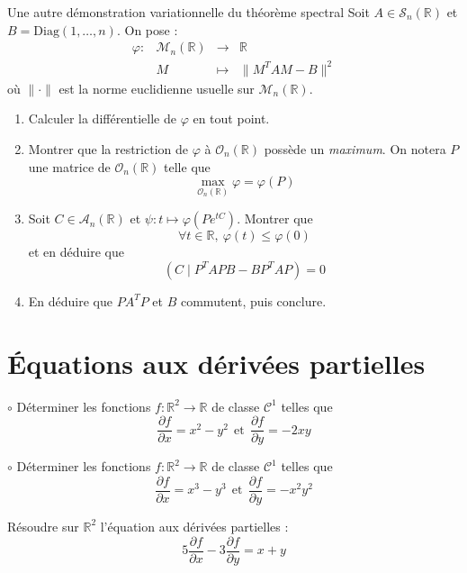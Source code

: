 \documentclass[french,a4paper]{article}
\newcommand{\R}{\mathbb{R}}
\theoremstyle{plain}
\theoremstyle{definition}
\theoremstyle{remark}
\begin{document}
\begin{ex}{Une autre démonstration variationnelle du théorème spectral}
	Soit $A\in\mathcal{S}_n(\R)$ et $B=\text{Diag}(1,\ldots,n)$. On pose : $$\begin{array}{lrcl}
		\varphi:&\mathcal{M}_n(\R)&\longrightarrow&\R\\
		&M&\longmapsto&\lVert M^TAM-B\rVert^2
	\end{array}$$ où $\lVert\cdot\rVert$ est la norme euclidienne usuelle sur $\mathcal{M}_n(\R)$.
	\begin{enumerate}
		\item Calculer la différentielle de $\varphi$ en tout point.
		\item Montrer que la restriction de $\varphi$ à $\mathcal{O}_n(\R)$ possède un \textit{maximum}. On notera $P$ une matrice de $\mathcal{O}_n(\R)$ telle que $$\underset{\mathcal{O}_n(\R)}{\max}\varphi=\varphi(P)$$
		\item Soit $C\in\mathcal{A}_n(\R)$ et $\psi:t\mapsto \varphi(Pe^{tC})$. Montrer que $$\forall t\in\R,\ \varphi(t)\leqslant\varphi(0)$$ et en déduire que $$\left(C\mid P^TAPB-BP^TAP\right)=0$$
		\item En déduire que $PA^TP$ et $B$ commutent, puis conclure.
	\end{enumerate}
\end{ex}

\section{Équations aux dérivées partielles}

\begin{ex}[Moulin.54]{$\circ$}
	Déterminer les fonctions $f:\R^2\to\R$ de classe $\mathcal{C}^1$ telles que $$\frac{\partial f}{\partial x}=x^2-y^2\ \ \text{et}\ \ \frac{\partial f}{\partial y}=-2xy$$
\end{ex}

\begin{ex}[Moulin.55]{$\circ$}
	Déterminer les fonctions $f:\R^2\to\R$ de classe $\mathcal{C}^1$ telles que $$\frac{\partial f}{\partial x}=x^3-y^3\ \ \text{et}\ \ \frac{\partial f}{\partial y}=-x^2y^2$$
\end{ex}

\begin{ex}[Moulin.56]{}
	Résoudre sur $\R^2$ l'équation aux dérivées partielles : $$5\frac{\partial f}{\partial x}-3\frac{\partial f}{\partial y}=x+y$$
\end{ex}
\end{document}
